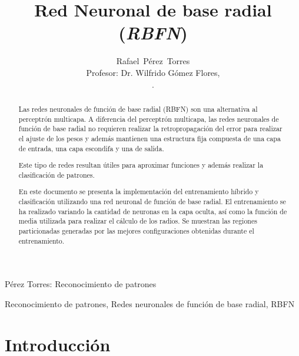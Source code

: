 \documentclass[journal]{IEEEtran}
\begin{document}

\title{Red Neuronal de base radial (\emph{RBFN})}

\author{Rafael~Pérez~Torres \\
	Profesor: Dr. Wilfrido Gómez Flores,\\[6pt].
	
}

%
{Pérez Torres: Reconocimiento de patrones}

\maketitle

\begin{abstract}
Las redes neuronales de función de base radial (RBFN) son una alternativa  al perceptrón multicapa.
A diferencia del perceptrón multicapa, las redes neuronales de función de base radial no requieren realizar la retropropagación del error para realizar el ajuste de los pesos y además mantienen una estructura fija compuesta de una capa de entrada, una capa escondifa y una de salida.

Este tipo de redes resultan útiles para aproximar funciones y además realizar la clasificación de patrones.

En este documento se presenta la implementación del entrenamiento híbrido y clasificación utilizando una red neuronal de función de base radial.
El entrenamiento se ha realizado variando la cantidad de neuronas en la capa oculta, así como la función de media utilizada para realizar el cálculo de los radios.
Se muestran las regiones particionadas generadas por las mejores configuraciones obtenidas durante el entrenamiento.
\end{abstract}

\begin{IEEEkeywords}
Reconocimiento de patrones, Redes neuronales de función de base radial, RBFN
\end{IEEEkeywords}

\section{Introducción}
\label{sec:introduccion}
\end{document}
